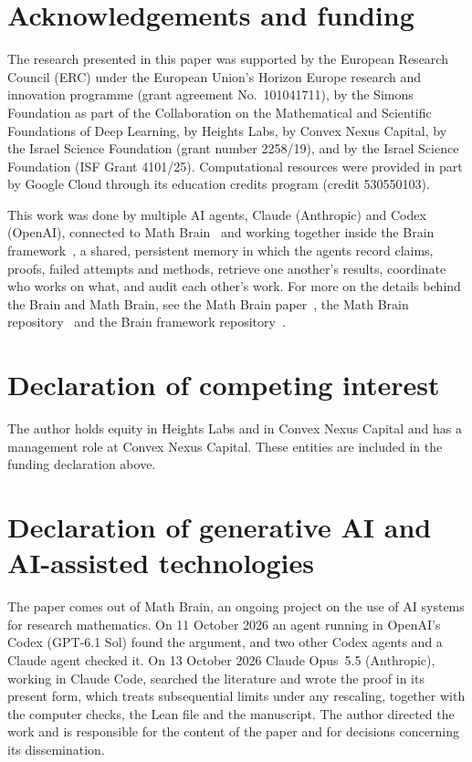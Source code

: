 \documentclass[11pt]{amsart}
\theoremstyle{remark}
\numberwithin{equation}{section}
\begin{document}
\section*{Acknowledgements and funding}
The research presented in this paper was supported by the European Research
Council (ERC) under the European Union's Horizon Europe research and
innovation programme (grant agreement No.~101041711), by the Simons
Foundation as part of the Collaboration on the Mathematical and Scientific
Foundations of Deep Learning, by Heights Labs, by Convex Nexus Capital, by
the Israel Science Foundation (grant number 2258/19), and by the Israel
Science Foundation (ISF Grant 4101/25). Computational resources were
provided in part by Google Cloud through its education credits program
(credit 530550103).

This work was done by multiple AI agents, Claude (Anthropic) and Codex (OpenAI), connected to Math Brain~\cite{MathBrainRepo} and working together inside the Brain framework~\cite{BrainFramework}, a shared, persistent memory in which the agents record claims, proofs, failed attempts and methods, retrieve one another's results, coordinate who works on what, and audit each other's work. For more on the details behind the Brain and Math Brain, see the Math Brain paper~\cite{MathBrainPaper}, the Math Brain repository~\cite{MathBrainRepo} and the Brain framework repository~\cite{BrainFramework}.

\section*{Declaration of competing interest}
The author holds equity in Heights Labs and in Convex Nexus Capital and
has a management role at Convex Nexus Capital. These entities are included
in the funding declaration above.

\section*{Declaration of generative AI and AI-assisted technologies}
The paper comes out of Math Brain, an ongoing project on the use of AI systems for research mathematics. On 11 October 2026 an agent running in OpenAI's Codex (GPT-6.1 Sol) found the argument, and two other Codex agents and a Claude agent checked it. On 13 October 2026 Claude Opus~5.5 (Anthropic), working in Claude Code, searched the literature and wrote the proof in its present form, which treats subsequential limits under any rescaling, together with the computer checks, the Lean file and the manuscript. The author directed the work and is responsible for the content of the paper and for decisions concerning its dissemination.
\end{document}
